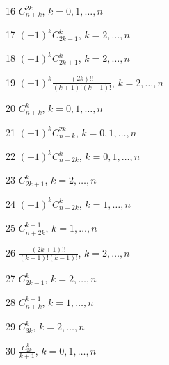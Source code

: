 \documentclass[11pt, russian]{article}
\begin{document}
16 
$C_{n+k}^{2k}$, $k=0,1,\ldots,n$\par\vspace{5mm}

17 
$(-1)^{k}C_{2k-1}^{k}$, $k=2,\ldots,n$\par\vspace{5mm}

18 
$(-1)^{k}C_{2k+1}^{k}$, $k=2,\ldots,n$\par\vspace{5mm}

19 
$(-1)^{k}\frac{(2k)!!}{(k+1)!(k-1)!}$, $k=2,\ldots,n$\par\vspace{5mm}

20 
$C_{n+k}^{k}$, $k=0,1,\ldots,n$\par\vspace{5mm}

21 
$(-1)^{k}C_{n+k}^{2k}$, $k=0,1,\ldots,n$\par\vspace{5mm}

22 
$(-1)^{k}C_{n+2k}^{k}$, $k=0,1,\ldots,n$\par\vspace{5mm}

23 
$C_{2k+1}^{k}$, $k=2,\ldots,n$\par\vspace{5mm}

24 
$(-1)^{k}C_{n+2k}^{k}$, $k=1,\ldots,n$\par\vspace{5mm}

25 
$C_{n+2k}^{k+1}$, $k=1,\ldots,n$\par\vspace{5mm}

26 
$\frac{(2k+1)!!}{(k+1)!(k-1)!}$, $k=2,\ldots,n$\par\vspace{5mm}

27 
$C_{2k-1}^{k}$, $k=2,\ldots,n$\par\vspace{5mm}

28 
$C_{n+k}^{k+1}$, $k=1,\ldots,n$\par\vspace{5mm}

29 
$C_{3k}^{k}$, $k=2,\ldots,n$\par\vspace{5mm}

30 
$\frac{C_{2k}^k}{k+1}$, $k=0,1,\ldots,n$\par\vspace{5mm}
\end{document}
